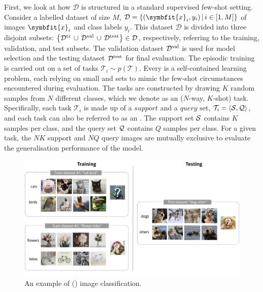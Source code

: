 First, we look at how \(\mathcal{D}\) is structured in a standard supervised few-shot setting. 
Consider a labelled dataset of size $M$, $\mathcal{D} = \left\{(\symbfit{x}_i, y_i)\, |\, i \in [1,M] \right\}$ of images $\symbfit{x}_i$ and class labels $y_i$. 
This dataset $\mathcal{D}$ is divided into three disjoint subsets: $\left\{\mathcal{D}^\textup{tr}\, \cup\, \mathcal{D}^\textup{val}\, \cup\, \mathcal{D}^\textup{test}\right\} \in \mathcal{D}$, respectively, referring to the training, validation, and test subsets. The validation dataset $\mathcal{D}^\textup{val}$ is used for model selection and the testing dataset $\mathcal{D}^\textup{test}$ for final evaluation. The episodic training is carried out on a set of tasks $\mathcal{T}_i \sim p(\mathcal{T})$. 
Every  is a self-contained learning problem, each relying on small  and  sets to mimic the few-shot circumstances encountered during evaluation.
The tasks are constructed by drawing $K$ random samples from $N$ different classes, which we denote as an ($N$-way, $K$-shot) task. 
Specifically, each task $\mathcal{T}_i$ is made up of a $\textit{support}$ and a $\textit{query}$ set, $\mathcal{T}_i=\langle \mathcal{S}, \mathcal{Q} \rangle$, and each task can also be referred to as an . 
The support set $\mathcal{S}$ contains $K$ samples per class, and the query set $\mathcal{Q}$ contains $Q$ samples per class. For a given task, the $NK$ support and $NQ$ query images are mutually exclusive to evaluate the generalisation performance of the model.
\begin{figure}[ht]
    \centering
    \captionsetup{justification=centering}
    \includegraphics[width=\linewidth]{chapters/assets/fsl/few-shot-classification.png}
    \caption{An example of () image classification.}
    \label{fig:fsl-tasks}
\end{figure}


